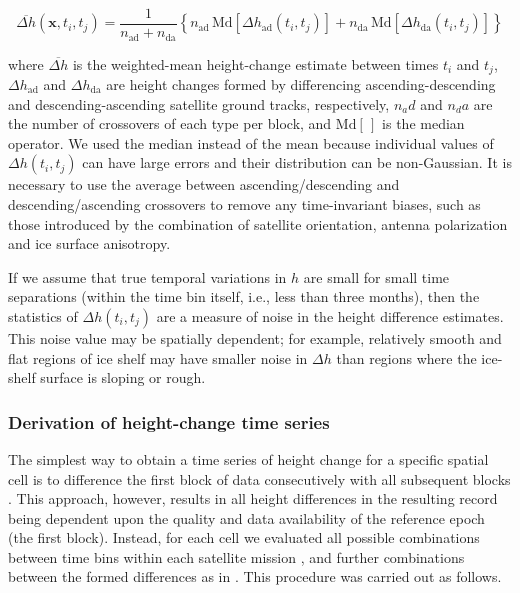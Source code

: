 \begin{equation}
  \overbar{\Delta h}(\mathbf{x}, t_i, t_j) = \frac{1}{n_\text{ad} + n_\text{da}} 
  \left\{
  n_\text{ad} \, \text{Md}\!\left[ \Delta h_\text{ad}(t_i, t_j) \right] +
  n_\text{da} \, \text{Md}\!\left[ \Delta h_\text{da}(t_i, t_j) \right]
  \right\}
  \label{c2e1}
\end{equation}

\noindent
where $\overbar{\Delta h}$ is the weighted-mean height-change estimate between times $t_i$ and $t_j$, $\Delta h_\text{ad}$ and $\Delta h_\text{da}$ are height changes formed by differencing ascending-descending and descending-ascending satellite ground tracks, respectively, $n_ad$ and $n_da$ are the number of crossovers of each type per block, and $\text{Md}[\,]$ is the median operator. We used the median instead of the mean because individual values of $\Delta h(t_i,t_j)$ can have large errors and their distribution can be non-Gaussian. It is necessary to use the average between ascending/descending and descending/ascending crossovers to remove any time-invariant biases, such as those introduced by the combination of satellite orientation, antenna polarization and ice surface anisotropy.

If we assume that true temporal variations in $h$ are small for small time separations (within the time bin itself, i.e., less than three months), then the statistics of $\Delta h(t_i,t_j)$ are a measure of noise in the height difference estimates. This noise value may be spatially dependent; for example, relatively smooth and flat regions of ice shelf may have smaller noise in $\Delta h$ than regions where the ice-shelf surface is sloping or rough.

\subsubsection{Derivation of height-change time series}

\noindent
The simplest way to obtain a time series of height change for a specific spatial cell is to difference the first block of data consecutively with all subsequent blocks \parencite[e.g.,][]{Zwally1989}. This approach, however, results in all height differences in the resulting record being dependent upon the quality and data availability of the reference epoch (the first block). Instead, for each cell we evaluated all possible combinations between time bins within each satellite mission \parencite{Zwally2001, Li2006}, and further combinations between the formed differences as in \textcite{Khvorostovsky2012}. This procedure was carried out as follows.

